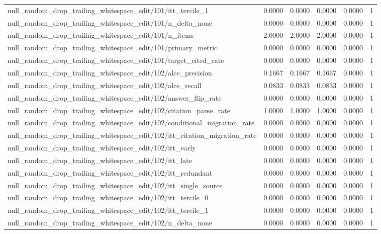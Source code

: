 \begin{table}[h]
\begin{tabular}{lrrrrr}
null_random_drop_trailing_whitespace_edit/101/itt_tercile_1 & 0.0000 & 0.0000 & 0.0000 & 0.0000 & 1 \\
null_random_drop_trailing_whitespace_edit/101/n_delta_none & 0.0000 & 0.0000 & 0.0000 & 0.0000 & 1 \\
null_random_drop_trailing_whitespace_edit/101/n_items & 2.0000 & 2.0000 & 2.0000 & 0.0000 & 1 \\
null_random_drop_trailing_whitespace_edit/101/primary_metric & 0.0000 & 0.0000 & 0.0000 & 0.0000 & 1 \\
null_random_drop_trailing_whitespace_edit/101/target_cited_rate & 0.0000 & 0.0000 & 0.0000 & 0.0000 & 1 \\
null_random_drop_trailing_whitespace_edit/102/alce_precision & 0.1667 & 0.1667 & 0.1667 & 0.0000 & 1 \\
null_random_drop_trailing_whitespace_edit/102/alce_recall & 0.0833 & 0.0833 & 0.0833 & 0.0000 & 1 \\
null_random_drop_trailing_whitespace_edit/102/answer_flip_rate & 0.0000 & 0.0000 & 0.0000 & 0.0000 & 1 \\
null_random_drop_trailing_whitespace_edit/102/citation_parse_rate & 1.0000 & 1.0000 & 1.0000 & 0.0000 & 1 \\
null_random_drop_trailing_whitespace_edit/102/conditional_migration_rate & 0.0000 & 0.0000 & 0.0000 & 0.0000 & 1 \\
null_random_drop_trailing_whitespace_edit/102/itt_citation_migration_rate & 0.0000 & 0.0000 & 0.0000 & 0.0000 & 1 \\
null_random_drop_trailing_whitespace_edit/102/itt_early & 0.0000 & 0.0000 & 0.0000 & 0.0000 & 1 \\
null_random_drop_trailing_whitespace_edit/102/itt_late & 0.0000 & 0.0000 & 0.0000 & 0.0000 & 1 \\
null_random_drop_trailing_whitespace_edit/102/itt_redundant & 0.0000 & 0.0000 & 0.0000 & 0.0000 & 1 \\
null_random_drop_trailing_whitespace_edit/102/itt_single_source & 0.0000 & 0.0000 & 0.0000 & 0.0000 & 1 \\
null_random_drop_trailing_whitespace_edit/102/itt_tercile_0 & 0.0000 & 0.0000 & 0.0000 & 0.0000 & 1 \\
null_random_drop_trailing_whitespace_edit/102/itt_tercile_1 & 0.0000 & 0.0000 & 0.0000 & 0.0000 & 1 \\
null_random_drop_trailing_whitespace_edit/102/n_delta_none & 0.0000 & 0.0000 & 0.0000 & 0.0000 & 1 \\

\end{tabular}
\end{table}
